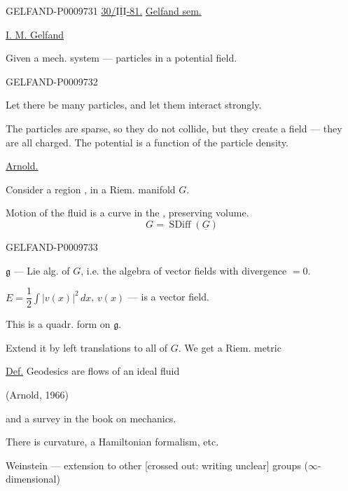 \begin{GelfandAdjacentEvidence}{GELFAND-P000973}{1}
\underline{30/\(\underline{\overline{\mathrm{III}}}\)-81.}\quad
\underline{Gelfand sem.}

\underline{I. M. Gelfand}


Given a mech. system --- particles in a potential field.
\end{GelfandAdjacentEvidence}
\begin{GelfandAdjacentEvidence}{GELFAND-P000973}{2}


Let there be many particles, and let them interact strongly.

The particles are sparse, so they do not collide, but they create a field --- they are all charged. The potential is a function of the particle density.

\underline{\underline{Arnold.}}\quad{}


Consider a region , in a Riem. manifold $G$.

Motion of the fluid is a curve in the , preserving volume.
\[
 G=\operatorname{SDiff}(\underline{G})
\]
\end{GelfandAdjacentEvidence}
\begin{GelfandAdjacentEvidence}{GELFAND-P000973}{3}


$\mathfrak g$ --- Lie alg. of $G$, i.e. the algebra of vector fields with divergence $=0$.

 $E=\dfrac12\displaystyle\int|v(x)|^2\,dx$,\quad
$v(x)$ --- is a vector field.

This is a quadr. form on $\mathfrak g$.

Extend it by left translations to all of $G$. We get a Riem. metric

\underline{Def.} Geodesics are flows of an ideal fluid

(Arnold, 1966)

 and a survey in the book on mechanics.

There is curvature, a Hamiltonian formalism, etc.

Weinstein --- extension to other [crossed out: writing unclear] groups ($\infty$-dimensional)
\end{GelfandAdjacentEvidence}


